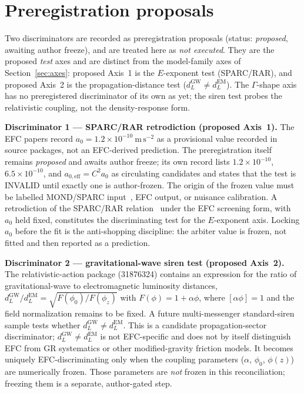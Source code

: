 \documentclass[11pt,a4paper]{article}
\begin{document}
\section{Preregistration proposals}
\label{sec:discriminators}

Two discriminators are recorded as preregistration proposals (status: \emph{proposed}, awaiting author freeze), and are treated here as \emph{not executed}. They are the proposed \emph{test} axes and are distinct from the model-family axes of Section~\ref{sec:axes}: proposed Axis~1 is the $E$-exponent test (SPARC/RAR), and proposed Axis~2 is the propagation-distance test ($d_{L}^{\mathrm{GW}} \neq d_{L}^{\mathrm{EM}}$). The $\Gamma$-shape axis has no preregistered discriminator of its own as yet; the siren test probes the relativistic coupling, not the density-response form.

\textbf{Discriminator 1 --- SPARC/RAR retrodiction (proposed Axis~1).} The EFC papers record $a_{0} = 1.2 \times 10^{-10}\ \mathrm{m\,s^{-2}}$ as a provisional value recorded in source packages, not an EFC-derived prediction. The preregistration itself remains \emph{proposed} and awaits author freeze; its own record lists $1.2\times10^{-10}$, $6.5\times10^{-10}$, and $a_{0,\mathrm{eff}} = C^{2}a_{0}$ as circulating candidates and states that the test is INVALID until exactly one is author-frozen. The origin of the frozen value must be labelled MOND/SPARC input~\cite{milgrom1983}, EFC output, or nuisance calibration. A retrodiction of the SPARC/RAR relation~\cite{mcgaugh2016} under the EFC screening form, with $a_{0}$ held fixed, constitutes the discriminating test for the $E$-exponent axis. Locking $a_{0}$ before the fit is the anti-shopping discipline: the arbiter value is frozen, not fitted and then reported as a prediction.

\textbf{Discriminator 2 --- gravitational-wave siren test (proposed Axis~2).} The relativistic-action package (31876324) contains an expression for the ratio of gravitational-wave to electromagnetic luminosity distances, $d_{L}^{\mathrm{GW}}/d_{L}^{\mathrm{EM}} = \sqrt{F(\phi_{0})/F(\phi_{z})}$ with $F(\phi) = 1 + \alpha\phi$, where $[\alpha\phi] = 1$ and the field normalization remains to be fixed. A future multi-messenger standard-siren sample tests whether $d_{L}^{\mathrm{GW}} \neq d_{L}^{\mathrm{EM}}$. This is a candidate propagation-sector discriminator; $d_{L}^{\mathrm{GW}} \neq d_{L}^{\mathrm{EM}}$ is not EFC-specific and does not by itself distinguish EFC from GR systematics or other modified-gravity friction models. It becomes uniquely EFC-discriminating only when the coupling parameters ($\alpha$, $\phi_{0}$, $\phi(z)$) are numerically frozen. Those parameters are \emph{not} frozen in this reconciliation; freezing them is a separate, author-gated step.
\end{document}
